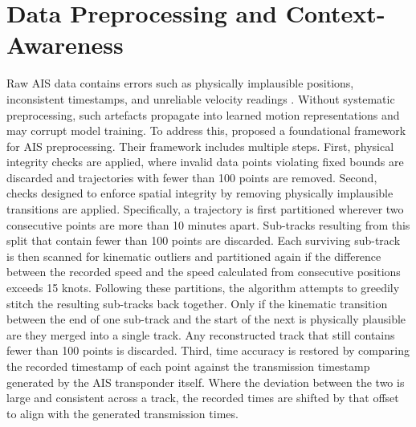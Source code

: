 \section[Data Preprocessing]{Data Preprocessing and Context-Awareness}
\label{sec:datapreprocessingandcontextawareness}
Raw \ac{AIS} data contains errors such as physically implausible positions, inconsistent timestamps, and unreliable velocity readings \parencite{Zhao_Shi_Yang_2018}. Without systematic preprocessing, such artefacts propagate into learned motion representations and may corrupt model training.
To address this, \textcite{Zhao_Shi_Yang_2018} proposed a foundational framework for \ac{AIS} preprocessing.
Their framework includes multiple steps.
First, physical integrity checks are applied, where invalid data points violating fixed bounds are discarded and trajectories with fewer than 100 points are removed.  
Second, checks designed to enforce spatial integrity by removing physically implausible transitions are applied.
Specifically, a trajectory is first partitioned wherever two consecutive points are more than 10 minutes apart.
Sub-tracks resulting from this split that contain fewer than 100 points are discarded.
Each surviving sub-track is then scanned for kinematic outliers and partitioned again if the difference between the recorded speed and the speed calculated from consecutive positions exceeds 15 knots. 
Following these partitions, the algorithm attempts to greedily stitch the resulting sub-tracks back together. Only if the kinematic transition between the end of one sub-track and the start of the next is physically plausible %
 are they merged into a single track. %
Any reconstructed track that still contains fewer than 100 points is discarded.
Third, time accuracy is restored by comparing the recorded timestamp of each point against the transmission timestamp generated by the AIS transponder itself. Where the deviation between the two is large and consistent across a track, the recorded times are shifted by that offset to align with the generated transmission times.


